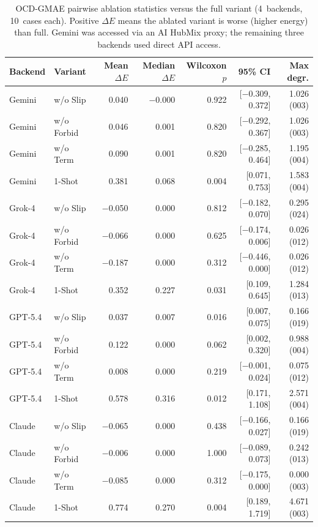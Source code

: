 \documentclass[%
 preprint,
 superscriptaddress,
 amsmath,amssymb,
 aps,
 prb,
 floatfix,
]{revtex4-2}
\begin{document}
\begin{table}[ht]
\centering
\small
\caption{OCD-GMAE pairwise ablation statistics versus the full variant (4~backends, 10~cases each). Positive $\Delta E$ means the ablated variant is worse (higher energy) than full. Gemini was accessed via an AI HubMix proxy; the remaining three backends used direct API access.}
\label{tab:si4-ocd-ablation-statistics}
\begin{tabular}{llrrrrr}
\toprule
Backend & Variant & Mean $\Delta E$ & Median $\Delta E$ & Wilcoxon $p$ & 95\% CI & Max degr. \\
\midrule
Gemini & w/o Slip & 0.040 & $-$0.000 & 0.922 & [$-$0.309, 0.372] & 1.026 (003) \\
Gemini & w/o Forbid & 0.046 & 0.001 & 0.820 & [$-$0.292, 0.367] & 1.026 (003) \\
Gemini & w/o Term & 0.090 & 0.001 & 0.820 & [$-$0.285, 0.464] & 1.195 (004) \\
Gemini & 1-Shot & 0.381 & 0.068 & 0.004 & [0.071, 0.753] & 1.583 (004) \\
\midrule
Grok-4 & w/o Slip & $-$0.050 & 0.000 & 0.812 & [$-$0.182, 0.070] & 0.295 (024) \\
Grok-4 & w/o Forbid & $-$0.066 & 0.000 & 0.625 & [$-$0.174, 0.006] & 0.026 (012) \\
Grok-4 & w/o Term & $-$0.187 & 0.000 & 0.312 & [$-$0.446, 0.000] & 0.026 (012) \\
Grok-4 & 1-Shot & 0.352 & 0.227 & 0.031 & [0.109, 0.645] & 1.284 (013) \\
\midrule
GPT-5.4 & w/o Slip & 0.037 & 0.007 & 0.016 & [0.007, 0.075] & 0.166 (019) \\
GPT-5.4 & w/o Forbid & 0.122 & 0.000 & 0.062 & [0.002, 0.320] & 0.988 (004) \\
GPT-5.4 & w/o Term & 0.008 & 0.000 & 0.219 & [$-$0.001, 0.024] & 0.075 (012) \\
GPT-5.4 & 1-Shot & 0.578 & 0.316 & 0.012 & [0.171, 1.108] & 2.571 (004) \\
\midrule
Claude & w/o Slip & $-$0.065 & 0.000 & 0.438 & [$-$0.166, 0.027] & 0.166 (019) \\
Claude & w/o Forbid & $-$0.006 & 0.000 & 1.000 & [$-$0.089, 0.073] & 0.242 (013) \\
Claude & w/o Term & $-$0.085 & 0.000 & 0.312 & [$-$0.175, 0.000] & 0.000 (003) \\
Claude & 1-Shot & 0.774 & 0.270 & 0.004 & [0.189, 1.719] & 4.671 (003) \\
\bottomrule
\end{tabular}
\end{table}
\end{document}
